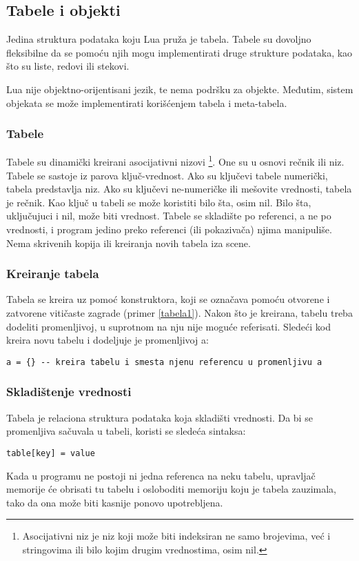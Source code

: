\documentclass[a4paper]{article}
\begin{document}
\subsection*{Tabele i objekti}
Jedina struktura podataka koju Lua pruža je tabela. Tabele su dovoljno fleksibilne da se pomoću njih mogu implementirati druge strukture podataka, kao što su liste, redovi ili stekovi.

Lua nije objektno-orijentisani jezik, te nema podršku za objekte. Međutim, sistem objekata se može implementirati korišćenjem tabela i meta-tabela.

\subsubsection*{Tabele}
Tabele su dinamički kreirani asocijativni nizovi \footnote{Asocijativni niz je niz koji može biti indeksiran ne samo brojevima, već i stringovima ili bilo kojim drugim vrednostima, osim nil.}. One su u osnovi rečnik ili niz. Tabele se sastoje iz parova ključ-vrednost. Ako su ključevi tabele numerički, tabela predstavlja niz. Ako su ključevi ne-numeričke ili mešovite vrednosti, tabela je rečnik. Kao ključ u tabeli se može koristiti bilo šta, osim nil. Bilo šta, uključujuci i nil, može biti vrednost.
Tabele se skladište po referenci, a ne po vrednosti, i program jedino preko referenci (ili pokazivača) njima manipuliše. Nema skrivenih kopija ili kreiranja novih tabela iza scene.

\subsubsection*{Kreiranje tabela}
Tabela se kreira uz pomoć konstruktora, koji se označava pomoću otvorene i zatvorene vitičaste zagrade (primer \ref{tabela1}). Nakon što je kreirana, tabelu treba dodeliti promenljivoj, u suprotnom na nju nije moguće referisati. Sledeći kod kreira novu tabelu i dodeljuje je promenljivoj a:
\begin{lstlisting}[caption={Kreiranje nove tabele i smeštanje u promenljivu},frame=single, label=tabela1]
a = {} -- kreira tabelu i smesta njenu referencu u promenljivu a
\end{lstlisting}

\subsubsection*{Skladištenje vrednosti}
Tabela je relaciona struktura podataka koja skladišti vrednosti. Da bi se promenljiva sačuvala u tabeli, koristi se sledeća sintaksa:
\begin{lstlisting}[caption={Čuvanje vrednosti \textit{value} u tabeli},frame=single, label=tabela1]
table[key] = value
\end{lstlisting}
Kada u programu ne postoji ni jedna referenca na neku tabelu, upravljač memorije će obrisati tu tabelu i osloboditi memoriju koju je tabela zauzimala, tako da ona može biti kasnije ponovo upotrebljena.
\end{document}
